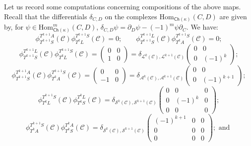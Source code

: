 \documentclass[11pt]{amsart}
\theoremstyle{definition}
\theoremstyle{remark}
\numberwithin{equation}{section}
\begin{document}
Let us record some computations concerning compositions of the above maps. Recall that the differentials $\delta_{C,D}$ on the complexes $\mathrm{Hom}_{\mathsf{Ch}(\kappa)}(C,D)$ are given by, for $\psi\in\mathrm{Hom}^m_{\mathsf{Ch}(\kappa)}(C,D)$,  $\delta_{C,D}\psi=\partial_D\psi-(-1)^m\psi\partial_C$.  We have: \begin{equation}\label{lazero}
	\phi_{T^{k+1}S}^{T^{k+1}A}(\mathcal{C})\phi_{T^kL}^{T^{k+1}S}(\mathcal{C})=0; \qquad \phi_{T^{k+1}S}^{T^{k+1}L}(\mathcal{C})\phi_{T^kA}^{T^{k+1}S}(\mathcal{C})=0; 	
\end{equation}
\begin{equation}\label{llhtopy}
	\phi_{T^{k+1}S}^{T^{k+1}L}(\mathcal{C})\phi_{T^kL}^{T^{k+1}S}(\mathcal{C})=\left(\begin{array}{cc} 0 & 0 \\ 1 & 0 \end{array}\right)=\delta_{\mathcal{L}^k(\mathcal{C}),\mathcal{L}^{k+1}(\mathcal{C})}\left(\begin{array}{cc} 0 & 0 \\ 0 & (-1)^k\end{array}\right);
\end{equation}
\begin{equation}\label{aahtopy}
		\phi_{T^{k+1}S}^{T^{k+1}A}(\mathcal{C})\phi_{T^kA}^{T^{k+1}S}(\mathcal{C})=\left(\begin{array}{cc} 0 & 0 \\ -1 & 0 \end{array}\right)=\delta_{\mathcal{A}^k(\mathcal{C}),\mathcal{A}^{k+1}(\mathcal{C})}\left(\begin{array}{cc} 0 & 0 \\ 0 & (-1)^{k+1}\end{array}\right);	
\end{equation}
\begin{equation}\label{sls}
		\phi^{T^{k+1}S}_{T^{k}L}(\mathcal{C})\phi_{T^kS}^{T^{k}L}(\mathcal{C})=\delta_{\mathcal{S}^{k}(\mathcal{C}),\mathcal{S}^{k+1}(\mathcal{C})}\left(\begin{array}{ccc} 0 & 0 & 0 \\ 0 & (-1)^k & 0 \\ 0 & 0 & 0 \end{array}\right);
	\end{equation}
\begin{equation}\label{sas}
	\phi^{T^{k+1}S}_{T^{k}A}(\mathcal{C})\phi_{T^kS}^{T^{k}A}(\mathcal{C})=\delta_{\mathcal{S}^{k}(\mathcal{C}),\mathcal{S}^{k+1}(\mathcal{C})}\left(\begin{array}{ccc} (-1)^{k+1} & 0 & 0 \\ 0 & 0 & 0 \\ 0 & 0 & 0 \end{array}\right); \mbox{ and }
\end{equation}
\end{document}
